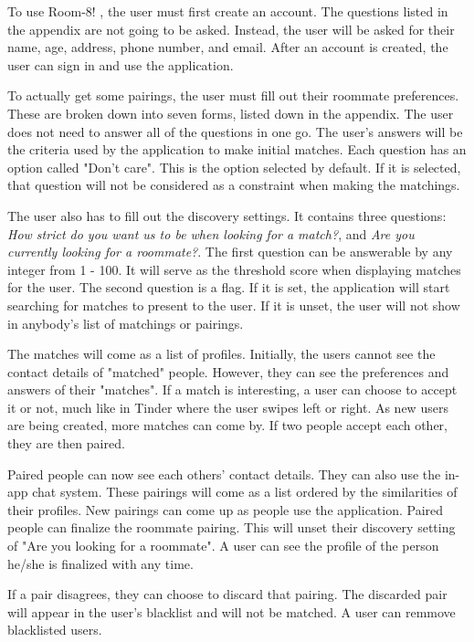 \documentclass[journal]{./IEEE/IEEEtran}
\newcommand{\APPNAME}{Room-8! }
\begin{document}
To use \APPNAME , the user must first create an account. The questions listed in the appendix are not going to be asked. Instead, the user will be asked for their name, age, address, phone number, and email. After an account is created, the user can sign in and use the application.

To actually get some pairings, the user must fill out their roommate preferences. These are broken down into seven forms, listed down in the appendix. The user does not need to answer all of the questions in one go. The user's answers will be the criteria used by the application to make initial matches. Each question has an option called "Don't care". This is the option selected by default. If it is selected, that question will not be considered as a constraint when making the matchings.

The user also has to fill out the discovery settings. It contains three questions: \textit{How strict do you want us to be when looking for a match?}, and \textit{Are you currently looking for a roommate?}. The first question can be answerable by any integer from 1 - 100. It will serve as the threshold score when displaying matches for the user. The second question is a flag. If it is set, the application will start searching for matches to present to the user. If it is unset, the user will not show in anybody's list of matchings or pairings.

The matches will come as a list of profiles. Initially, the users cannot see the contact details of "matched" people. However, they can see the preferences and answers of their "matches". If a match is interesting, a user can choose to accept it or not, much like in Tinder where the user swipes left or right. As new users are being created, more matches can come by. If two people accept each other, they are then paired.

Paired people can now see each others' contact details. They can also use the in-app chat system. These pairings will come as a list ordered by the similarities of their profiles. New pairings can come up as people use the application. Paired people can finalize the roommate pairing. This will unset their discovery setting of "Are you looking for a roommate". A user can see the profile of the person he/she is finalized with any time.

If a pair disagrees, they can choose to discard that pairing. The discarded pair will appear in the user's blacklist and will not be matched. A user can remmove blacklisted users.
\end{document}
